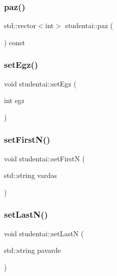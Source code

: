 \mbox{\label{classstudentai_a0a5183a3d9679d0a71e0e6f8a1c70560}} 
\subsubsection{\texorpdfstring{paz()}{paz()}}
{\footnotesize\ttfamily std\+::vector$<$int$>$ studentai\+::paz (\begin{DoxyParamCaption}{ }\end{DoxyParamCaption}) const\hspace{0.3cm}{\ttfamily [inline]}}

\mbox{\label{classstudentai_a10215f49f69a1148944514a4fc9cc85e}} 
\subsubsection{\texorpdfstring{set\+Egz()}{setEgz()}}
{\footnotesize\ttfamily void studentai\+::set\+Egz (\begin{DoxyParamCaption}\item[{int}]{egz }\end{DoxyParamCaption})\hspace{0.3cm}{\ttfamily [inline]}}

\mbox{\label{classstudentai_aaf16dbbb2208e3392bbf94afc6820c4f}} 
\subsubsection{\texorpdfstring{set\+First\+N()}{setFirstN()}}
{\footnotesize\ttfamily void studentai\+::set\+FirstN (\begin{DoxyParamCaption}\item[{std\+::string}]{vardas }\end{DoxyParamCaption})\hspace{0.3cm}{\ttfamily [inline]}}

\mbox{\label{classstudentai_a4f5899eb5c1cf528141e4c238c26cd22}} 
\subsubsection{\texorpdfstring{set\+Last\+N()}{setLastN()}}
{\footnotesize\ttfamily void studentai\+::set\+LastN (\begin{DoxyParamCaption}\item[{std\+::string}]{pavarde }\end{DoxyParamCaption})\hspace{0.3cm}{\ttfamily [inline]}}

